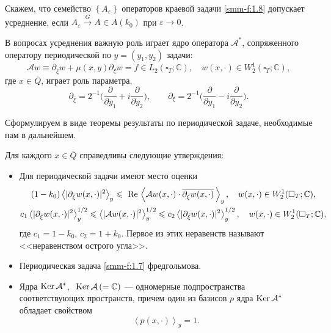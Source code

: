 \begin{definition}
	Скажем, что семейство $\left\{ A_\varepsilon \right\}$ операторов
краевой задачи \eqref{smm-f:1.8}  допускает усреднение, если $A_\varepsilon \overset{G}{\longrightarrow}A\in A(k_0) $ при
$\varepsilon\to 0$.
\end{definition}

В вопросах усреднения важную роль играет ядро оператора $\mathcal{A}^*$, сопряженного оператору периодической по $y=(y_1,y_2)$ задачи:
\begin{equation}\label{smm-f:1.7}
	\mathcal{A}w\equiv \partial_{\overline{\xi}}w +\mu(x,y) \partial_{\xi}w =f\in L_2(\square_T;\mathbb{C}),\quad
	w(x,\cdot)\in W_2^1(\square_T;\mathbb{C}),
\end{equation}
где $x\in \overline Q$, играет роль параметра,
$$
\partial_{\bar \xi}=2^{-1}\Big(\frac{\partial}{\partial y_1}+i\frac{\partial}{\partial y_2}\Big),\qquad  \partial_{\xi}=2^{-1}\Big(\frac{\partial}{\partial y_1}-i\frac{\partial}{\partial y_2}\Big).
$$

Сформулируем в виде теоремы результаты по периодической задаче, необходимые нам в дальнейшем.
	
	
\begin{theorem}\label{smm-th1.2}
Для каждого $x\in\overline Q$ справедливы следующие утверждения:
\begin{itemize}
\item  Для периодической задачи имеют место оценки
\begin{gather*}
	(1-k_0)\left<|\partial_{\bar{\xi}}w(x,\cdot)|^2\right>_y\leqslant \text{ Re\,}\left<\mathcal{A}w(x,\cdot)\cdot \overline{\partial_{\bar{\xi}}w(x,\cdot)}\,\right>_y,\quad  w(x,\cdot)\in W_2^1(\square_T;\mathbb{C}),\\
	c_1\left<|\partial_{\bar{\xi}}w(x,\cdot)|^2\right>_y^{1/2}\leqslant
	\left<|\mathcal{A}w(x,\cdot)|^2\right>_y^{1/2}\leqslant c_2\left<|\partial_{\bar{\xi}}w(x,\cdot)|^2\right>_y^{1/2}, \quad  w(x,\cdot)\in W_2^1(\square_T;\mathbb{C}),
\end{gather*}
где $c_1=1-k_0$, $c_2=1+k_0$. Первое из этих неравенств называют <<неравенством острого угла>>.
\item  Периодическая задача \eqref{smm-f:1.7} фредгольмова.
\item Ядра  $\text{Ker\,}\mathcal{A}^\ast$, $\text{ Ker\,}\mathcal{A}\,(=\mathbb{C})$
	--- одномерные подпространства соответствующих пространств,
	причем один из базисов $p$ ядра
	$\text{Ker\,}\mathcal{A}^\ast$ обладает свойством
	\begin{equation}\label{smm-df:1.10}
 \left< p(x,\cdot)\right>_y=1.
	\end{equation}
\end{itemize}
\end{theorem}

